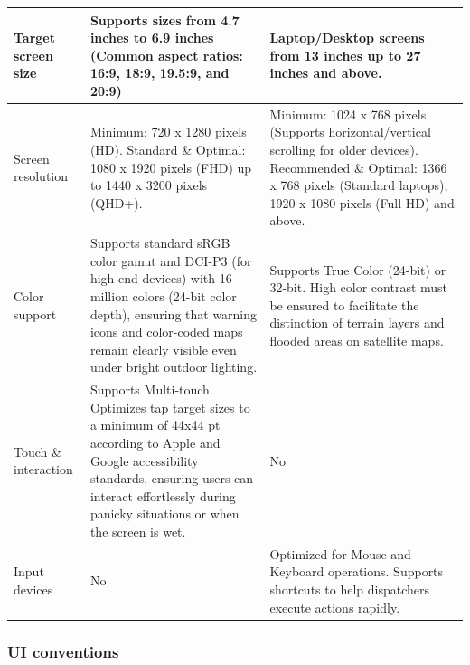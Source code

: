 \documentclass[../Main.tex]{subfiles}
\begin{document}
\begin{xltabular}{\textwidth}{|l|X|X|}
    Target screen size   & Supports sizes from 4.7 inches to 6.9 inches (Common aspect ratios: 16:9, 18:9, 19.5:9, and 20:9)                                                                                                                              & Laptop/Desktop screens from 13 inches up to 27 inches and above.                                                                                                                             \\
    \hline
    Screen resolution    & Minimum: 720 x 1280 pixels (HD). Standard \& Optimal: 1080 x 1920 pixels (FHD) up to 1440 x 3200 pixels (QHD+).                                                                                                                & Minimum: 1024 x 768 pixels (Supports horizontal/vertical scrolling for older devices). Recommended \& Optimal: 1366 x 768 pixels (Standard laptops), 1920 x 1080 pixels (Full HD) and above. \\
    \hline
    Color support        & Supports standard sRGB color gamut and DCI-P3 (for high-end devices) with 16 million colors (24-bit color depth), ensuring that warning icons and color-coded maps remain clearly visible even under bright outdoor lighting.  & Supports True Color (24-bit) or 32-bit. High color contrast must be ensured to facilitate the distinction of terrain layers and flooded areas on satellite maps.                             \\
    \hline
    Touch \& interaction & Supports Multi-touch. Optimizes tap target sizes to a minimum of 44x44 pt according to Apple and Google accessibility standards, ensuring users can interact effortlessly during panicky situations or when the screen is wet. & No                                                                                                                                                                                           \\
    \hline
    Input devices        & No                                                                                                                                                                                                                             & Optimized for Mouse and Keyboard operations. Supports shortcuts to help dispatchers execute actions rapidly.                                                                                 \\
    \hline
\end{xltabular}

\subsubsection{UI conventions}
\end{document}
